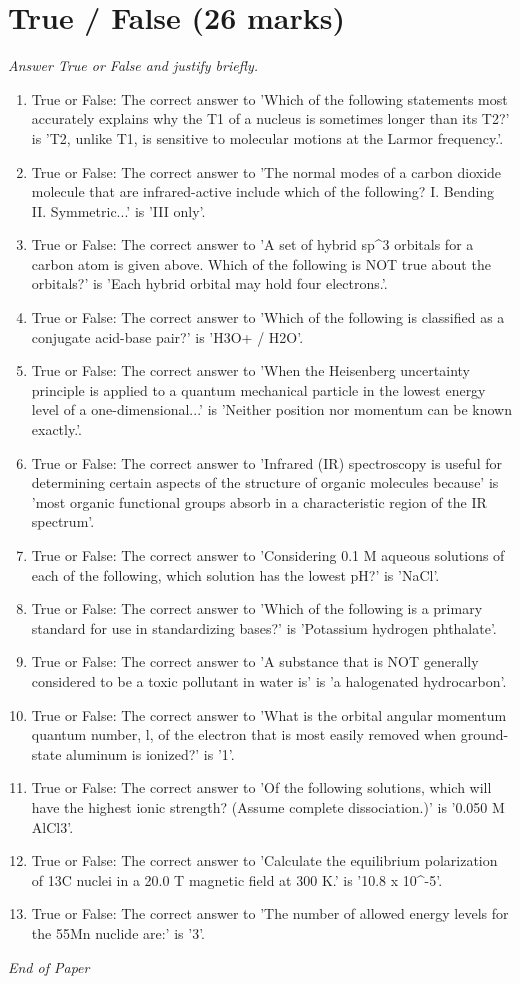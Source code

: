 \documentclass[12pt]{article}
\begin{document}
\section*{True / False (26 marks)}
\textit{Answer True or False and justify briefly.}
\begin{enumerate}[label=\arabic*.]
\item True or False: The correct answer to 'Which of the following statements most accurately explains why the T1 of a nucleus is sometimes longer than its T2?' is 'T2, unlike T1, is sensitive to molecular motions at the Larmor frequency.'.
\item True or False: The correct answer to 'The normal modes of a carbon dioxide molecule that are infrared-active include which of the following? I. Bending II. Symmetric...' is 'III only'.
\item True or False: The correct answer to 'A set of hybrid sp\^{}3 orbitals for a carbon atom is given above. Which of the following is NOT true about the orbitals?' is 'Each hybrid orbital may hold four electrons.'.
\item True or False: The correct answer to 'Which of the following is classified as a conjugate acid-base pair?' is 'H3O+ / H2O'.
\item True or False: The correct answer to 'When the Heisenberg uncertainty principle is applied to a quantum mechanical particle in the lowest energy level of a one-dimensional...' is 'Neither position nor momentum can be known exactly.'.
\item True or False: The correct answer to 'Infrared (IR) spectroscopy is useful for determining certain aspects of the structure of organic molecules because' is 'most organic functional groups absorb in a characteristic region of the IR spectrum'.
\item True or False: The correct answer to 'Considering 0.1 M aqueous solutions of each of the following, which solution has the lowest pH?' is 'NaCl'.
\item True or False: The correct answer to 'Which of the following is a primary standard for use in standardizing bases?' is 'Potassium hydrogen phthalate'.
\item True or False: The correct answer to 'A substance that is NOT generally considered to be a toxic pollutant in water is' is 'a halogenated hydrocarbon'.
\item True or False: The correct answer to 'What is the orbital angular momentum quantum number, l, of the electron that is most easily removed when ground-state aluminum is ionized?' is '1'.
\item True or False: The correct answer to 'Of the following solutions, which will have the highest ionic strength? (Assume complete dissociation.)' is '0.050 M AlCl3'.
\item True or False: The correct answer to 'Calculate the equilibrium polarization of 13C nuclei in a 20.0 T magnetic field at 300 K.' is '10.8 x 10\^{}-5'.
\item True or False: The correct answer to 'The number of allowed energy levels for the 55Mn nuclide are:' is '3'.
\end{enumerate}

\vfill
\noindent\textit{End of Paper}
\end{document}
